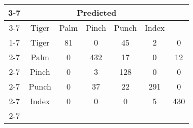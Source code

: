 \documentclass{standalone}
\begin{document}
 
 \begin{tabular}{|c |c |c |c |c |c |c |}
\cline{3-7}\multicolumn{2}{c|}{} & \multicolumn{5}{c|}{Predicted} \\ 
\cline{3-7} \multicolumn{2}{c |}{ } & Tiger & Palm & Pinch & Punch & Index\\ 
\cline{1-7}\multirow{5}{*}{\rotatebox[origin=c]{90}{Actual}} & Tiger & 81 & 0 & 45 & 2 & 0\\ 
 \cline{2-7} & Palm & 0 & 432 & 17 & 0 & 12\\ 
 \cline{2-7} & Pinch & 0 & 3 & 128 & 0 & 0\\ 
 \cline{2-7} & Punch & 0 & 37 & 22 & 291 & 0\\ 
 \cline{2-7} & Index & 0 & 0 & 0 & 5 & 430\\ 
 \cline{2-7}\hline \end{tabular}
 
\end{document}
